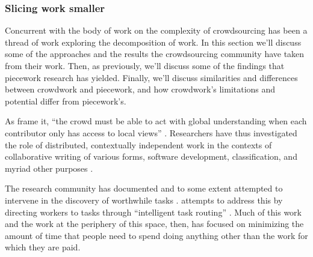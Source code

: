 \documentclass[trackingWork]{subfiles}
\begin{document}
\subsubsection[slicing work into smaller parts]{Slicing work smaller
}\label{sec:Slicing}

Concurrent with the body of work on the complexity of crowdsourcing
has been a thread of work exploring the decomposition of work.
In this section we'll discuss some of the approaches and the results 
the crowdsourcing community have taken from their work.
Then, as previously,
we'll discuss some of the findings that piecework research
has yielded.
Finally, we'll discuss similarities and differences between crowdwork and piecework,
and how crowdwork's limitations and potential differ from piecework's.

\subsubsubsection{\crowdworkpers}
As \citeauthor{verroios2014context} frame it,
``the crowd must be able to act with
global understanding when each contributor only has access to local views''
\cite{verroios2014context}.
Researchers have thus investigated the role of
distributed, contextually independent work
in the contexts of collaborative writing of various forms,
software development,
classification, and myriad other purposes
\cite{Kittur:2009:CCI:1518701.1518928,Baecker:1993:UID:169059.169312,
      10.2307/1562247,karnin2010crowdsourcing,bragg2013crowdsourcing,
      chilton2013cascade}.


The research community has documented and to some extent attempted to intervene in
the discovery of worthwhile tasks
\cite{taskSearch}.
\citeauthor{Cosley:2007:SUI:1216295.1216309}
attempts to address this by
directing workers to tasks through
``intelligent task routing''
\cite{Cosley:2007:SUI:1216295.1216309}.
Much of this work and the work at the periphery of this space, then,
has focused on
minimizing the amount of time that people need to spend doing
anything other than the work for which they are paid.
\end{document}
